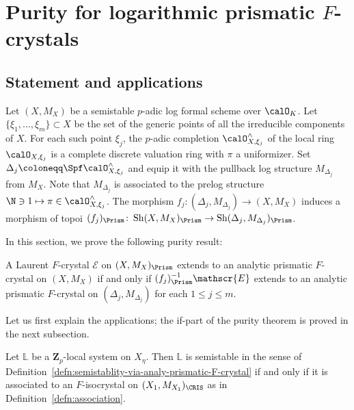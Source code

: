 \section{Purity for logarithmic prismatic \texorpdfstring{$F$}{F}-crystals} \label{sec:purity}

\subsection{Statement and applications} \label{subsec:purity-statement-applications}

Let $(X, M_X)$ be a semistable $p$-adic log formal scheme over $\calO_K$. Let $\{\xi_1,\ldots,\xi_m\}\subset X$ be the set of the generic points of all the irreducible components of  $X$. For each such point $\xi_j$, the $p$-adic completion $\calO_{X,\xi_j}^\wedge$ of the local ring $\calO_{X,\xi_j}$ is a complete discrete valuation ring with $\pi$ a uniformizer. Set $\Delta_j\coloneqq \Spf \calO_{X,\xi_j}^\wedge$ and equip it with the pullback log structure $M_{\Delta_j}$ from $M_X$. Note that $M_{\Delta_j}$ is associated to the prelog structure $\N\ni 1\mapsto \pi\in \calO_{X,\xi_j}^\wedge$. The morphism $f_j\colon(\Delta_j,M_{\Delta_j})\rightarrow (X,M_X)$ induces a morphism of topoi $(f_j)_{\Prism}\colon \operatorname{Sh}(X,M_X)_\Prism\rightarrow \operatorname{Sh}(\Delta_j,M_{\Delta_j})_\Prism$. 

In this section, we prove the following purity result:

\begin{thm} \label{thm:main-purity}
A Laurent $F$-crystal $\mathscr{E}$ on $(X,M_X)_\Prism$ extends to an analytic prismatic $F$-crystal on $(X,M_X)$ if and only if $(f_j)_{\Prism}^{-1}\mathscr{E}$ extends to an analytic prismatic $F$-crystal on $(\Delta_j,M_{\Delta_j})$ for each $1\leq j\leq m$.    
\end{thm}

Let us first explain the applications; the if-part of the purity theorem is proved in the next subsection.

\begin{cor} \label{cor:semistable-prismatic-Faltings-equivalent}
Let $\mathbb{L}$ be a $\mathbf{Z}_p$-local system on $X_{\eta}$. Then $\mathbb{L}$ is semistable in the sense of Definition~\ref{defn:semistablity-via-analy-prismatic-F-crystal} if and only if it is associated to an $F$-isocrystal on $(X_1,M_{X_1})_{\CRIS}$ as in Definition~\ref{defn:association}.    
\end{cor}

